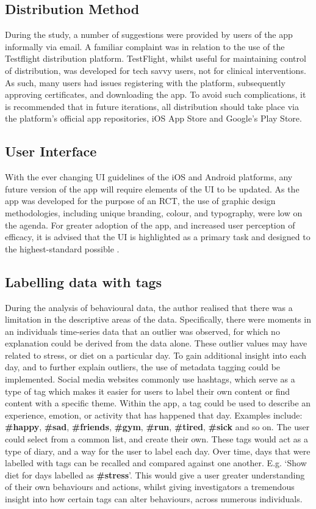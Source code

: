 \subsection{Distribution Method}
During the study, a number of suggestions were provided by users of the app informally via email. A familiar complaint was in relation to the use of the Testflight distribution platform. TestFlight, whilst useful for maintaining control of distribution, was developed for tech savvy users, not for clinical interventions. As such, many users had issues registering with the platform, subsequently approving certificates, and downloading the app. To avoid such complications, it is recommended that in future iterations, all distribution should take place via the platform’s official app repositories, iOS App Store and Google’s Play Store.


\subsection{User Interface}
With the ever changing UI guidelines of the iOS and Android platforms, any future version of the app will require elements of the UI to be updated. As the app was developed for the purpose of an RCT, the use of graphic design methodologies, including unique branding, colour, and typography, were low on the agenda. For greater adoption of the app, and increased user perception of efficacy, it is advised that the UI is highlighted as a primary task and designed to the highest-standard possible \cite{Soper2014}.

\subsection{Labelling data with tags}
During the analysis of behavioural data, the author realised that there was a limitation in the descriptive areas of the data. Specifically, there were moments in an individuals time-series data that an outlier was observed, for which no explanation could be derived from the data alone. These outlier values may have related to stress, or diet on a particular day.
To gain additional insight into each day, and to further explain outliers, the use of metadata tagging could be implemented. Social media websites commonly use hashtags, which serve as a type of tag which makes it easier for users to label their own content or find content with a specific theme.
\newline Within the app, a tag could be used to describe an experience, emotion, or activity that has happened that day. Examples include: \textbf{\#happy}, \textbf{\#sad}, \textbf{\#friends}, \textbf{\#gym}, \textbf{\#run}, \textbf{\#tired}, \textbf{\#sick} and so on. The user could select from a common list, and create their own. These tags would act as a type of diary, and a way for the user to label each day. Over time, days that were labelled with tags can be recalled and compared against one another. E.g. `Show diet for days labelled as \textbf{\#stress}'.
This would give a user greater understanding of their own behaviours and actions, whilst giving investigators a tremendous insight into how certain tags can alter behaviours, across numerous individuals.

